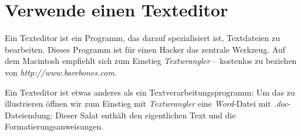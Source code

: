 
\chapter{Verwende einen Texteditor}

Ein Texteditor ist ein Programm, das darauf spezialisiert ist, Textdateien zu bearbeiten. Dieses Programm ist für einen Hacker das zentrale Werkzeug. Auf dem Macintosh empfiehlt sich zum Einstieg \emph{Textwrangler} – kostenlos zu beziehen von \emph{http://www.barebones.com}.

Ein Texteditor ist etwas anderes als ein Textverarbeitungsprogramm: Um das zu illustrieren öffnen wir zum Einstieg mit \emph{Textwrangler} eine \emph{Word}-Datei mit \emph{.doc}-Dateiendung: Dieser Salat enthält den eigentlichen Text und die Formatierungsanweisungen.